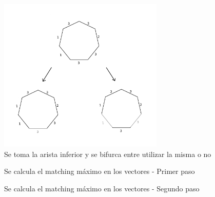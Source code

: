 \documentclass[a4paper, 12pt]{article}
\begin{document}
\begin{figure}[H]
\begin{center}
\includegraphics[width=0.7\textwidth]{imagenes/paso1y2.png}
\caption{Se toma la arista inferior y se bifurca entre utilizar la misma o no}
\end{center}
\end{figure}

\begin{figure}[H]
\centering
{}
\qquad
{}
\caption{Se calcula el matching máximo en los vectores - Primer paso}
\end{figure}

\begin{figure}[H]
\centering
{}
\qquad
{}
\caption{Se calcula el matching máximo en los vectores - Segundo paso}
\end{figure}
\end{document}
